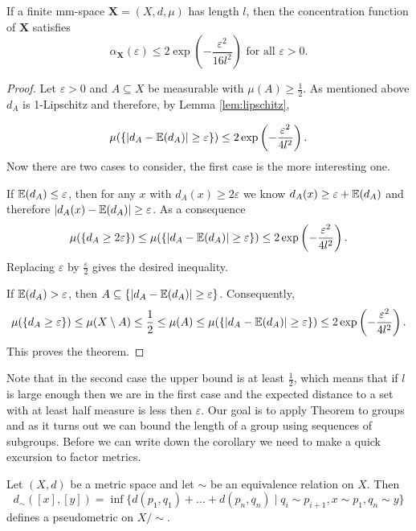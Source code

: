 \begin{theorem}\label{thm:measureConcetration}
If a finite mm-space $\boldsymbol{X}=(X,d,\mu)$ has length $l$, then the concentration function of $\boldsymbol X$ satisfies
\[\alpha_{\boldsymbol{X}}(\varepsilon)\leq 2\exp\left(-\frac{\varepsilon^2}{16l^2}\right)\text{ for all $\varepsilon>0$}.\]
\end{theorem}
\begin{proof}
Let $\varepsilon>0$ and $A\subseteq X$ be measurable with $\mu(A)\geq\frac{1}{2}$. As mentioned above $d_A$ is 1-Lipschitz and therefore, by Lemma \ref{lem:lipschitz},

\[\mu(\{|d_A-\mathbb{E}(d_A)|\geq\varepsilon\})\leq 2\exp\left(-\frac{\varepsilon^2}{4l^2}\right).\]
Now there are two cases to consider, the first case is the more interesting one.

If $\mathbb{E}(d_A)\leq\varepsilon$, then for any $x$ with $d_A(x)\geq2\varepsilon$ we know $d_A(x)\geq \varepsilon+\mathbb{E}(d_A)$ and therefore $|d_A(x)-\mathbb{E}(d_A)|\geq \varepsilon$. As a consequence %
\[\mu(\{d_A\geq2\varepsilon\})\leq \mu(\{|d_A-\mathbb{E}(d_A)|\geq\varepsilon\})\leq2\exp\left(-\frac{\varepsilon^2}{4l^2}\right) .\]
Replacing $\varepsilon$ by $\frac{\varepsilon}{2}$ gives the desired inequality.

If $\mathbb{E}(d_A)>\varepsilon$, then $A\subseteq \{|d_A-\mathbb{E}(d_A)|\geq\varepsilon\}$. Consequently,
\[\mu(\{d_A\geq\varepsilon\})\leq \mu(X\setminus A)\leq \frac{1}{2}\leq \mu(A)\leq \mu(\{|d_A-\mathbb{E}(d_A)|\geq\varepsilon\})\leq 2\exp\left(-\frac{\varepsilon^2}{4l^2}\right).\]
This proves the theorem.
\end{proof}
Note that in the second case the upper bound is at least $\frac{1}{2}$, which means that if $l$ is large enough then we are in the first case and the expected distance to a set with at least half measure is less then $\varepsilon$. 
Our goal is to apply Theorem to groups and as it turns out we can bound the length of a group using sequences of subgroups. Before we can write down the corollary we need to make a quick excursion to factor metrics. 

\begin{definition}
Let $(X,d)$ be a metric space and let $\sim$ be an equivalence relation on $X$. Then \[d_\sim([x],[y])=\inf\{d(p_1,q_1)+\dots+d(p_n,q_n)\mid q_i\sim p_{i+1}, x\sim p_1, q_n\sim y\}\] defines a pseudometric on $X/{\sim}$.
\end{definition}

